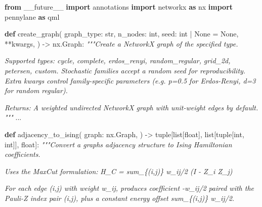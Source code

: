 \documentclass[
  11pt,
]{report}
\newenvironment{Shaded}{}{}
\newcommand{\BuiltInTok}[1]{\textcolor[rgb]{0.00,0.50,0.00}{#1}}
\newcommand{\CommentTok}[1]{\textcolor[rgb]{0.38,0.63,0.69}{\textit{#1}}}
\newcommand{\ImportTok}[1]{\textcolor[rgb]{0.00,0.50,0.00}{\textbf{#1}}}
\newcommand{\KeywordTok}[1]{\textcolor[rgb]{0.00,0.44,0.13}{\textbf{#1}}}
\newcommand{\NormalTok}[1]{#1}
\newcommand{\OperatorTok}[1]{\textcolor[rgb]{0.40,0.40,0.40}{#1}}
\newcommand{\VariableTok}[1]{\textcolor[rgb]{0.10,0.09,0.49}{#1}}
\begin{document}
\begin{Shaded}
\begin{Highlighting}[]
\ImportTok{from}\NormalTok{ \_\_future\_\_ }\ImportTok{import}\NormalTok{ annotations}
\ImportTok{import}\NormalTok{ networkx }\ImportTok{as}\NormalTok{ nx}
\ImportTok{import}\NormalTok{ pennylane }\ImportTok{as}\NormalTok{ qml}


\KeywordTok{def}\NormalTok{ create\_graph(}
\NormalTok{    graph\_type: }\BuiltInTok{str}\NormalTok{,}
\NormalTok{    n\_nodes: }\BuiltInTok{int}\NormalTok{,}
\NormalTok{    seed: }\BuiltInTok{int} \OperatorTok{|} \VariableTok{None} \OperatorTok{=} \VariableTok{None}\NormalTok{,}
    \OperatorTok{**}\NormalTok{kwargs,}
\NormalTok{) }\OperatorTok{{-}\textgreater{}}\NormalTok{ nx.Graph:}
    \CommentTok{"""Create a NetworkX graph of the specified type.}

\CommentTok{    Supported types: \textquotesingle{}cycle\textquotesingle{}, \textquotesingle{}complete\textquotesingle{}, \textquotesingle{}erdos\_renyi\textquotesingle{}, \textquotesingle{}random\_regular\textquotesingle{},}
\CommentTok{    \textquotesingle{}grid\_2d\textquotesingle{}, \textquotesingle{}petersen\textquotesingle{}, \textquotesingle{}custom\textquotesingle{}. Stochastic families accept a random}
\CommentTok{    seed for reproducibility. Extra kwargs control family{-}specific}
\CommentTok{    parameters (e.g. p=0.5 for Erdos{-}Renyi, d=3 for random regular).}

\CommentTok{    Returns:}
\CommentTok{        A weighted undirected NetworkX graph with unit{-}weight edges}
\CommentTok{        by default.}
\CommentTok{    """}
\NormalTok{    ...}


\KeywordTok{def}\NormalTok{ adjacency\_to\_ising(}
\NormalTok{    graph: nx.Graph,}
\NormalTok{) }\OperatorTok{{-}\textgreater{}} \BuiltInTok{tuple}\NormalTok{[}\BuiltInTok{list}\NormalTok{[}\BuiltInTok{float}\NormalTok{], }\BuiltInTok{list}\NormalTok{[}\BuiltInTok{tuple}\NormalTok{[}\BuiltInTok{int}\NormalTok{, }\BuiltInTok{int}\NormalTok{]], }\BuiltInTok{float}\NormalTok{]:}
    \CommentTok{"""Convert a graph\textquotesingle{}s adjacency structure to Ising Hamiltonian coefficients.}

\CommentTok{    Uses the MaxCut formulation:}
\CommentTok{        H\_C = sum\_\{(i,j)\} w\_ij/2 (I {-} Z\_i Z\_j)}

\CommentTok{    For each edge (i,j) with weight w\_ij, produces coefficient {-}w\_ij/2}
\CommentTok{    paired with the Pauli{-}Z index pair (i,j), plus a constant energy}
\CommentTok{    offset sum\_\{(i,j)\} w\_ij/2.}


\end{Highlighting}
\end{Shaded}
\end{document}
